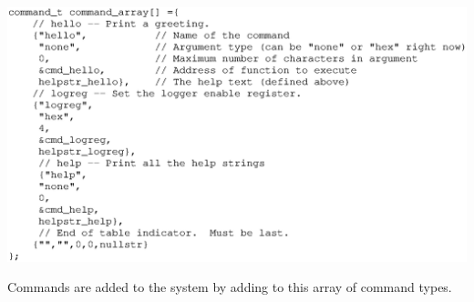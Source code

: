 \begin{listing}[ht]
    \begin{center}
        \includegraphics[clip,scale=0.75]{command_array}
        \caption{Commands are added to the system by adding to this array of command types.\label{lst:cmdarray}}
    \end{center}
\end{listing}

\clearpage{}
